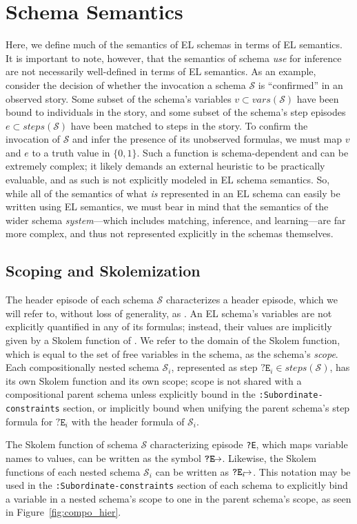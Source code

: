 \section{Schema Semantics}
Here, we define much of the semantics of EL schemas in terms of EL semantics. It is important to note, however, that the semantics of schema \textit{use} for inference are not necessarily well-defined in terms of EL semantics. As an example, consider the decision of whether the invocation a schema $\mathcal{S}$ is ``confirmed'' in an observed story. Some subset of the schema's variables $v \subset vars(\mathcal{S})$ have been bound to individuals in the story, and some subset of the schema's step episodes $e \subset steps(\mathcal{S})$ have been matched to steps in the story. To confirm the invocation of $\mathcal{S}$ and infer the presence of its unobserved formulas, we must map $v$ and $e$ to a truth value in $\{0, 1\}$. Such a function is schema-dependent and can be extremely complex; it likely demands an external heuristic to be practically evaluable, and as such is not explicitly modeled in EL schema semantics. So, while all of the semantics of what \textit{is} represented in an EL schema can easily be written using EL semantics, we must bear in mind that the semantics of the wider schema \textit{system}---which includes matching, inference, and learning---are far more complex, and thus not represented explicitly in the schemas themselves.

\subsection{Scoping and Skolemization}
The header episode of each schema $\mathcal{S}$ characterizes a header episode, which we will refer to, without loss of generality, as . An EL schema's variables are not explicitly quantified in any of its formulas; instead, their values are implicitly given by a Skolem function of . We refer to the domain of the Skolem function, which is equal to the set of free variables in the schema, as the schema's \textit{scope}. Each compositionally nested schema $\mathcal{S}_{i}$, represented as step $\texttt{?E}_{i} \in steps(\mathcal{S})$, has its own Skolem function and its own scope; scope is not shared with a compositional parent schema unless explicitly bound in the \texttt{:Subordinate-constraints} section, or implicitly bound when unifying the parent schema's step formula for $\texttt{?E}_{i}$ with the header formula of $\mathcal{S}_{i}$.

The Skolem function of schema $\mathcal{S}$ characterizing episode \texttt{?E}, which maps variable names to values, can be written as the symbol $\texttt{?E}\hspace{-2mm}\rightarrow$. Likewise, the Skolem functions of each nested schema $\mathcal{S}_{i}$ can be written as $\texttt{?E}_{i}\hspace{-2mm}\rightarrow$. This notation may be used in the \texttt{:Subordinate-constraints} section of each schema to explicitly bind a variable in a nested schema's scope to one in the parent schema's scope, as seen in Figure~\ref{fig:compo_hier}.

